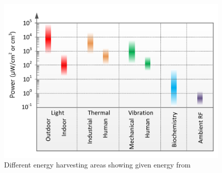 \documentclass[article,a4paper]{IEEEtran}
\begin{document}
\begin{figure}
    \includegraphics[width=\columnwidth]{EnergyHarvest1.png}
    \caption{ Different energy harvesting areas showing given energy from \cite{Energyharvest1} }
    \label{fig1_Energy_harvest }
\end{figure}
\end{document}
